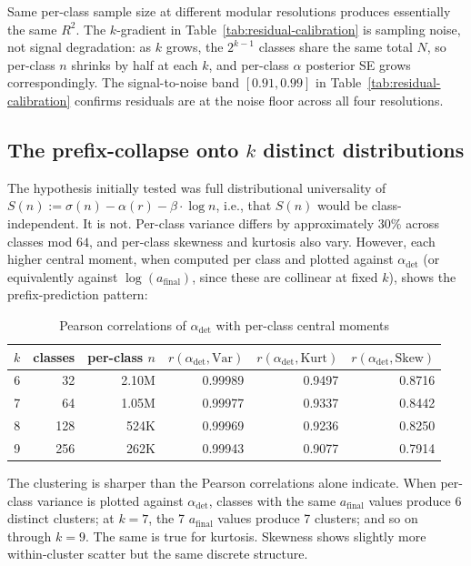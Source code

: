 \documentclass[pdflatex,sn-mathphys-num]{sn-jnl}
\theoremstyle{thmstyleone}%
\theoremstyle{definition}
\theoremstyle{plain}
\begin{document}
Same per-class sample size at different modular resolutions produces essentially the same $R^2$. The $k$-gradient in Table~\ref{tab:residual-calibration} is sampling noise, not signal degradation: as $k$ grows, the $2^{k-1}$ classes share the same total $N$, so per-class $n$ shrinks by half at each $k$, and per-class $\alpha$ posterior SE grows correspondingly. The signal-to-noise band $[0.91, 0.99]$ in Table~\ref{tab:residual-calibration} confirms residuals are at the noise floor across all four resolutions.

\subsection{The prefix-collapse onto $k$ distinct distributions}
\label{sec:moment-clustering}
The hypothesis initially tested was full distributional universality of $S(n) := \sigma(n) - \alpha(r) - \beta \cdot \log n$, i.e., that $S(n)$ would be class-independent. It is not. Per-class variance differs by approximately $30\%$ across classes mod $64$, and per-class skewness and kurtosis also vary. However, each higher central moment, when computed per class and plotted against $\alpha_{\text{det}}$ (or equivalently against $\log(a_{\text{final}})$, since these are collinear at fixed $k$), shows the prefix-prediction pattern:

\begin{table}[ht]
\centering
\caption{Pearson correlations of $\alpha_{\text{det}}$ with per-class central moments}
\label{tab:central-moments}
\begin{tabular}{rrrrrr}
\toprule
$k$ & classes & per-class $n$ & $r(\alpha_{\text{det}}, \text{Var})$ & $r(\alpha_{\text{det}}, \text{Kurt})$ & $r(\alpha_{\text{det}}, \text{Skew})$ \\
\midrule
6 & 32 & 2.10M & 0.99989 & 0.9497 & 0.8716 \\
7 & 64 & 1.05M & 0.99977 & 0.9337 & 0.8442 \\
8 & 128 & 524K & 0.99969 & 0.9236 & 0.8250 \\
9 & 256 & 262K & 0.99943 & 0.9077 & 0.7914 \\
\bottomrule
\end{tabular}
\end{table}

The clustering is sharper than the Pearson correlations alone indicate. When per-class variance is plotted against $\alpha_{\text{det}}$, classes with the same $a_{\text{final}}$ values produce 6 distinct clusters; at $k=7$, the 7 $a_{\text{final}}$ values produce 7 clusters; and so on through $k=9$. The same is true for kurtosis. Skewness shows slightly more within-cluster scatter but the same discrete structure.
\end{document}
